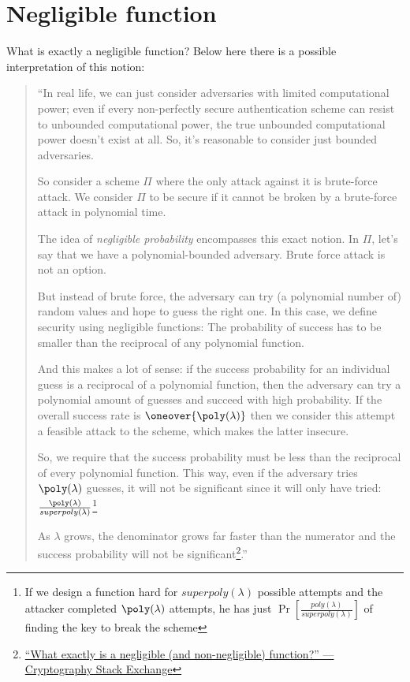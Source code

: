 
\section{Negligible function}

What is exactly a negligible function? Below here there is a possible interpretation of this notion:
\begin{quotation}
    ``In real life, we can just consider adversaries with limited computational power; even if every non-perfectly secure authentication scheme can resist to unbounded computational power, the true unbounded computational power doesn't exist at all. So, it's reasonable to consider just bounded adversaries.

    So consider a scheme $\Pi$ where the only attack against it is brute-force attack. We consider $\Pi$ to be secure if it cannot be broken by a brute-force attack in polynomial time.

    The idea of \emph{negligible probability} encompasses this exact notion. In $\Pi$, let's say that we have a polynomial-bounded adversary. Brute force attack is not an option.

    But instead of brute force, the adversary can try (a polynomial number of) random values and hope to guess the right one. In this case, we define security using negligible functions: The probability of success has to be smaller than the reciprocal of any polynomial function.

    And this makes a lot of sense: if the success probability for an individual guess is a reciprocal of a polynomial function, then the adversary can try a polynomial amount of guesses and succeed with high probability. If the overall success rate is $\oneover{\poly(\lambda)}$ then we consider this attempt a feasible attack to the scheme, which makes the latter insecure.

    So, we require that the success probability must be less than the reciprocal of every polynomial function. This way, even if the adversary tries $\poly(\lambda)$ guesses, it will not be significant since it will only have tried: $\frac{\poly(\lambda)}{superpoly(\lambda)}$\footnote{If we design a function hard for $superpoly(\lambda)$ possible attempts and the attacker completed $\poly(\lambda)$ attempts, he has just $\Pr[\frac{poly(\lambda)}{superpoly(\lambda)}] $ of finding the key to break the scheme}

    As $\lambda$ grows, the denominator grows far faster than the numerator and the success probability will not be significant\footnote{\href{https://crypto.stackexchange.com/questions/5832/what-exactly-is-a-negligible-and-non-negligible-function}{\textsf{``What exactly is a negligible (and non-negligible) function?'' --- Cryptography Stack Exchange}}}.''

\end{quotation}


